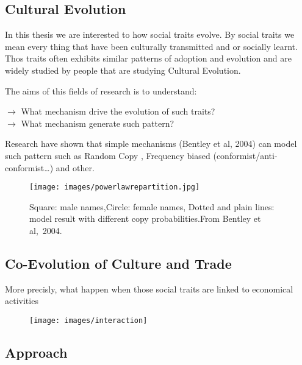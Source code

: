 \documentclass[a4paper]{article}
\begin{document}
\subsection*{Cultural Evolution}
In this thesis we are interested to how social traits evolve. By social traits we mean every thing that have been culturally transmitted and or socially learnt. Thos traits often exhibits similar patterns of adoption and evolution and are widely studied by people that are studying Cultural Evolution. 

The aims of this fields of research is to understand:\\

\begin{minipage}{\textwidth}
    $\rightarrow$ What mechanism drive the evolution of such traits?\\
    $\rightarrow$ What mechanism generate such pattern?
\end{minipage}
\vspace{2cm}

Research have shown that simple mechanisms (Bentley et al, 2004) can model such pattern such as Random Copy , Frequency biased (conformist/anti-conformist\dots) and other.

\begin{figure}
    \centering
    \texttt{[image: images/powerlawrepartition.jpg]}
    \caption{Square: male names,Circle: female names, Dotted and plain lines: model result with different copy probabilities.From Bentley et al,~2004.}

\end{figure}
\subsection*{Co-Evolution of Culture and Trade}
More precisly, what happen when those social traits are linked to economical activities

\begin{figure}
    \centering
    \texttt{[image: images/interaction]}	
\end{figure}
%
%
%
%
\subsection*{Approach}
\end{document}
